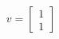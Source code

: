 \documentclass{article}
\begin{document}
\begin{align*}
v=\begin{bmatrix}1\\1\end{bmatrix}
\end{align*}
\end{document}
